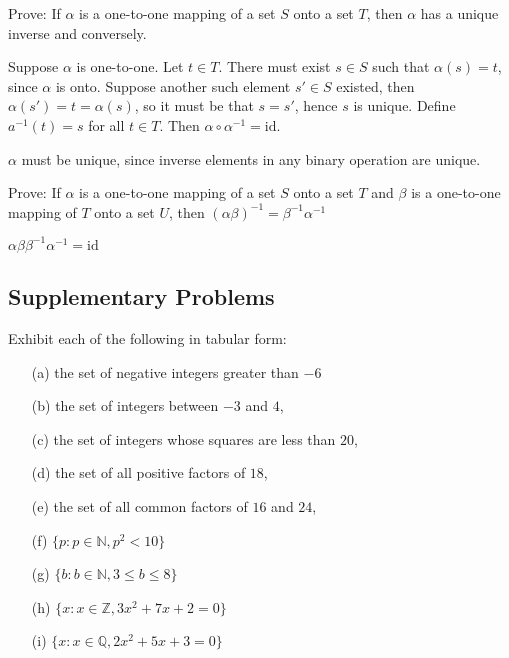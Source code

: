 \exercise
Prove: If $\alpha$ is a one-to-one mapping of a set $S$ onto a set $T$, then $\alpha$ has a unique inverse and conversely.

\answer
Suppose $\alpha$ is one-to-one. Let $t \in T$. There must exist $s \in S$ such that $\alpha(s) = t$, since $\alpha$ is onto. Suppose another such element $s' \in S$ existed, then $\alpha(s') = t = \alpha(s)$, so it must be that $s = s'$, hence $s$ is unique. Define $a^{-1}(t) = s$ for all $t \in T$. Then $\alpha \circ \alpha^{-1} = \text{id}$. 

$\alpha$ must be unique, since inverse elements in any binary operation are unique.


\exercise 
Prove: If $\alpha$ is a one-to-one mapping of a set $S$ onto a set $T$ and $\beta$ is a one-to-one mapping of $T$ onto a set $U$, then $(\alpha\beta)^{-1} = \beta^{-1} \alpha^{-1}$

\answer
$\alpha \beta \beta^{-1} \alpha^{-1} = \text{id}$


\subsection*{Supplementary Problems}

\exercise
Exhibit each of the following in tabular form:
\begin{enumerate}
    \item[(a)]
        the set of negative integers greater than $-6$
    \item[(b)]
        the set of integers between $-3$ and $4$,
    \item[(c)]
        the set of integers whose squares are less than $20$,
    \item[(d)]
        the set of all positive factors of $18$,
    \item[(e)]
        the set of all common factors of $16$ and $24$,
    \item[(f)]
        $\{p:p \in \mathbb{N}, p^2 < 10\}$
    \item[(g)]
        $\{b: b \in \mathbb{N}, 3 \leq b \leq 8\}$
    \item[(h)]
        $\{x: x \in \mathbb{Z}, 3x^2 + 7x + 2 = 0\}$
    \item[(i)]
        $\{x: x \in \mathbb{Q}, 2x^2 + 5x + 3 = 0\}$
\end{enumerate}

